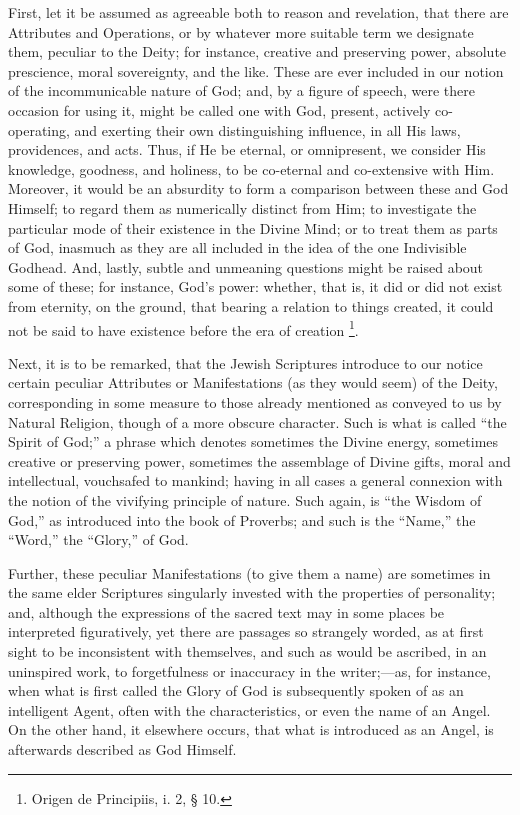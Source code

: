First, let it be assumed as agreeable both to reason and
revelation, that there are Attributes and Operations, or by whatever
more suitable term we designate them, peculiar to the Deity; for
instance, creative and preserving power, absolute prescience, moral
sovereignty, and the like. These are ever included in our notion of
the incommunicable nature of God; and, by a figure of speech, were
there occasion for using it, might be called one with God, present,
actively co-operating, and exerting their own distinguishing
influence, in all His laws, providences, and acts. Thus, if He be
eternal, or omnipresent, we consider His knowledge, goodness, and
holiness, to be co-eternal and co-extensive with Him. Moreover, it
would be an absurdity to form a comparison between these and God
Himself; to regard them as numerically distinct from Him; to
investigate the particular mode of their existence in the Divine Mind;
or to treat them as parts of God, inasmuch as they are all included in
the idea of the one Indivisible Godhead. And, lastly, subtle and
unmeaning questions might be raised about some of these; for instance,
God's power: whether, that is, it did or did not exist from eternity,
on the ground, that bearing a relation to things created, it could not
be said to have existence before the era of creation \footnote{Origen de Principiis, i. 2, § 10.}.

Next, it is to be remarked, that the Jewish Scriptures introduce to
our notice certain peculiar Attributes or Manifestations (as they
would seem) of the Deity, corresponding in some measure to those
already mentioned as conveyed to us by Natural Religion, though of a
more obscure character. Such is what is called ``the Spirit of
God;'' a phrase which denotes sometimes the Divine energy,
sometimes creative or preserving power, sometimes the assemblage of
Divine gifts, moral and intellectual, vouchsafed to mankind; having in
all cases a general connexion with the notion of the vivifying
principle of nature. Such again, is ``the Wisdom of God,'' as
introduced into the book of Proverbs; and such is the
``Name,'' the ``Word,'' the ``Glory,'' of God.

Further, these peculiar Manifestations (to give them a name) are
sometimes in the same elder Scriptures singularly invested with the
properties of personality; and, although the expressions of the sacred
text may in some places be interpreted figuratively, yet there are
passages so strangely worded, as at first sight to be inconsistent
with themselves, and such as would be ascribed, in an uninspired work,
to forgetfulness or inaccuracy in the writer;—as, for instance, when
what is first called the Glory of God is subsequently spoken of as an
intelligent Agent, often with the characteristics, or even the name of
an Angel. On the other hand, it elsewhere occurs, that what is
introduced as an Angel, is afterwards described as God Himself.

